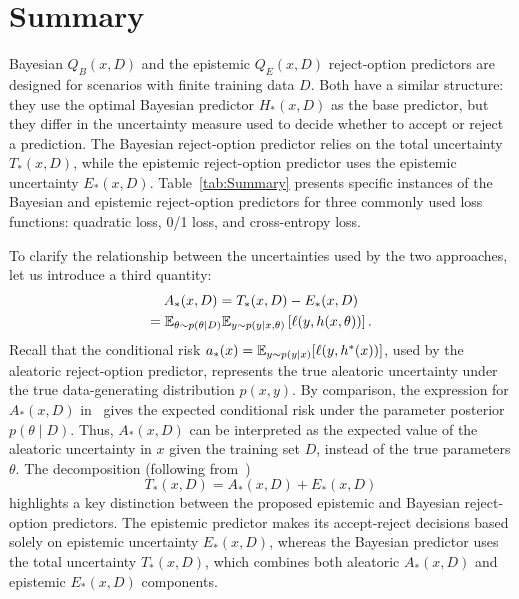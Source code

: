\section{Summary}
\label{sec:summary}

%

Bayesian $Q_B(x,D)$ and the epistemic $Q_E(x,D)$ reject-option predictors are designed for scenarios with finite training data $D$. Both have a similar structure: they use the optimal Bayesian predictor $H_*(x,D)$ as the base predictor, but they differ in the uncertainty measure used to decide whether to accept or reject a prediction. The Bayesian reject-option predictor relies on the total uncertainty $T_*(x,D)$, while the epistemic reject-option predictor uses the epistemic uncertainty $E_*(x,D)$. Table~\ref{tab:Summary} presents specific instances of the Bayesian and epistemic reject-option predictors for three commonly used loss functions: quadratic loss, 0/1 loss, and cross-entropy loss. 

To clarify the relationship between the uncertainties used by the two approaches, let us introduce a third quantity:
\begin{multline}
\label{equ:AleatorUncertainty}
A_*(x, D)  =  T_*(x, D) - E_*(x, D) \\
 =  {\mathbb{E}}_{\theta\sim p(\theta\mid D)}{\mathbb{E}}_{y\sim p(y\mid x,\theta)} \left[\ell(y, h(x, \theta))\right].
\end{multline}
%
Recall that the conditional risk $a_*(x) = {\mathbb{E}}_{y \sim p(y \mid x)}[\ell(y, h^*(x))]$, used by the aleatoric reject-option predictor, represents the true aleatoric uncertainty under the true data-generating distribution $p(x,y)$. By comparison, the expression for $A_*(x,D)$ in~ gives the expected conditional risk under the parameter posterior $p(\theta\mid D)$. Thus, $A_*(x,D)$ can be interpreted as the expected value of the aleatoric uncertainty in $x$ given the training set $D$, instead of the true parameters $\theta$. 
The decomposition (following from~)
\[ 
  T_*(x,D)=A_*(x,D)+E_*(x,D)
\]
%
highlights a key distinction between the proposed epistemic and Bayesian reject-option predictors. The epistemic predictor makes its accept-reject decisions based solely on epistemic uncertainty $E_*(x,D)$, whereas the Bayesian predictor uses the total uncertainty $T_*(x,D)$, which combines both aleatoric $A_*(x,D)$ and epistemic $E_*(x,D)$ components. 

